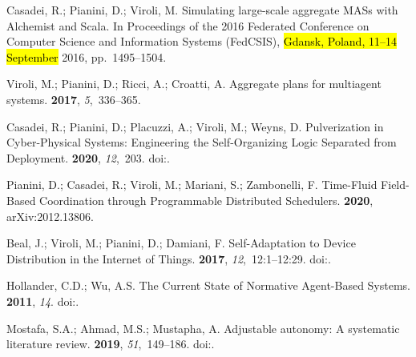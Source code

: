 \documentclass[jsan,article,accept,moreauthors,pdftex]{Definitions/mdpi}
\begin{document}
\begin{thebibliography}{999}
Casadei, R.; Pianini, D.; Viroli, M.
\newblock Simulating large-scale aggregate MASs with Alchemist and Scala.
\newblock  In Proceedings of the 2016 Federated Conference on Computer Science and Information Systems (FedCSIS), \hl{Gdansk, Poland, 11--14 September} 2016, pp.~1495--1504.

Viroli, M.; Pianini, D.; Ricci, A.; Croatti, A.
\newblock Aggregate plans for multiagent systems.
 {\bf 2017}, {\em
  5},~336--365.

Casadei, R.; Pianini, D.; Placuzzi, A.; Viroli, M.; Weyns, D.
\newblock Pulverization in Cyber-Physical Systems: Engineering the
  Self-Organizing Logic Separated from Deployment.
 {\bf 2020}, {\em 12},~203.
\newblock
  doi:{\href{https://doi.org/10.3390/fi12110203}{}}.

Pianini, D.; Casadei, R.; Viroli, M.; Mariani, S.; Zambonelli, F.
\newblock Time-Fluid Field-Based Coordination through Programmable Distributed
  Schedulers.
 {\bf 2020},  	arXiv:2012.13806.

Beal, J.; Viroli, M.; Pianini, D.; Damiani, F.
\newblock Self-Adaptation to Device Distribution in the Internet of Things.
 {\bf 2017}, {\em
  12},~12:1--12:29.
\newblock
  doi:{\href{https://doi.org/10.1145/3105758}{}}.

Hollander, C.D.; Wu, A.S.
\newblock The Current State of Normative Agent-Based Systems.
 {\bf 2011}, {\em 14}.
\newblock
  doi:{\href{https://doi.org/10.18564/jasss.1750}{}}.

Mostafa, S.A.; Ahmad, M.S.; Mustapha, A.
\newblock Adjustable autonomy: A systematic literature review.
 {\bf 2019}, {\em 51},~149--186.
\newblock
  doi:{\href{https://doi.org/10.1007/s10462-017-9560-8}{}}.


\end{thebibliography}
\end{document}
